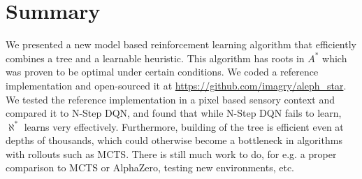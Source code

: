 \documentclass{article}
\newcommand{\alephstar}{$\aleph^*$ }
\newcommand{\astar}{$A^*$ }
\begin{document}
\section{Summary}
\label{sec:summary}

We presented a new model based reinforcement learning algorithm that efficiently combines a tree and a learnable heuristic. This algorithm has roots in \astar which was proven to be optimal under certain conditions. We coded a reference implementation and open-sourced it at \url{https://github.com/imagry/aleph_star}. We tested the reference implementation in a pixel based sensory context and compared it to N-Step DQN, and found that while N-Step DQN fails to learn, \alephstar learns very effectively. Furthermore, building of the tree is efficient even at depths of thousands, which could otherwise become a bottleneck in algorithms with rollouts such as MCTS. There is still much work to do, for e.g. a proper comparison to MCTS or AlphaZero, testing new environments, etc.


{

\small

}
\end{document}
